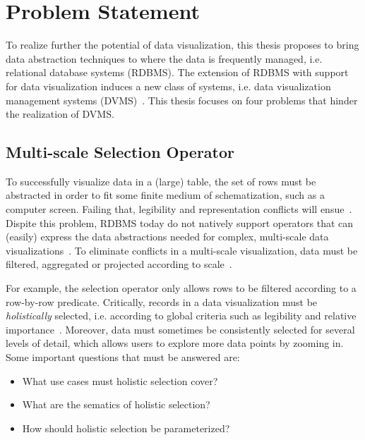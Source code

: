 \documentclass[11pt, oneside]{report}
\begin{document}
\section{Problem Statement}
\label{sec:introduction:problem:statement}

To realize further the potential of data visualization, this thesis proposes to bring data abstraction techniques to where the data is frequently managed, i.e. relational database systems (RDBMS). The extension of RDBMS with support for data visualization induces a new class of systems, i.e. data visualization management systems (DVMS)~\cite{wu2014case}. This thesis focuses on four problems that hinder the realization of DVMS.

\subsection{Multi-scale Selection Operator}
To successfully visualize data in a (large) table, the set of rows must be abstracted in order to fit some finite medium of schematization, such as a computer screen. Failing that, legibility and representation conflicts will ensue~\cite{woodruff1998constant, topfer1966principles}. Dispite this problem, RDBMS today do not natively support operators that can (easily) express the data abstractions needed for complex, multi-scale data visualizations~\cite{wu2014case}. To eliminate conflicts in a multi-scale visualization, data must be filtered, aggregated or projected according to scale~\cite{weibel1999generalising, nongeo9999reference}.

For example, the selection operator only allows rows to be filtered according to a row-by-row predicate. Critically, records in a data visualization must be \emph{holistically} selected, i.e. according to global criteria such as legibility and relative importance~\cite{weibel:controls:of:generalization}. Moreover, data must sometimes be consistently selected for several levels of detail, which allows users to explore more data points by zooming in. Some important questions that must be answered are:

\begin{itemize}
\item What use cases must holistic selection cover? 
\item What are the sematics of holistic selection?
\item How should holistic selection be parameterized?
\end{itemize}
\end{document}
